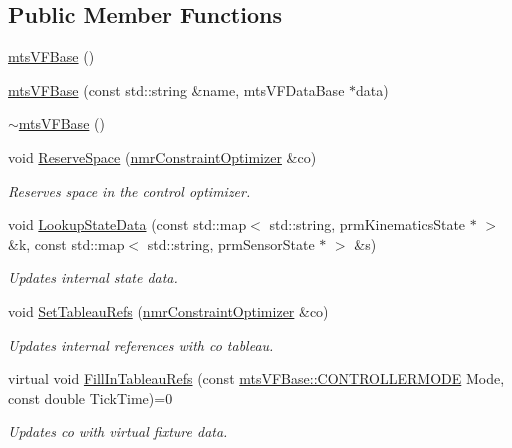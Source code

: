\subsection*{Public Member Functions}
\begin{DoxyCompactItemize}
\item 
\hyperlink{classmts_v_f_base_af45f36da21548b4a27ed600ea297f561}{mts\-V\-F\-Base} ()
\item 
\hyperlink{classmts_v_f_base_a987037c15360ca274ea15bf77566d287}{mts\-V\-F\-Base} (const std\-::string \&name, mts\-V\-F\-Data\-Base $\ast$data)
\item 
\hyperlink{classmts_v_f_base_a2759ee462431dd6812a0d692a9e77421}{$\sim$mts\-V\-F\-Base} ()
\item 
void \hyperlink{classmts_v_f_base_a3e76c6704734935a282808ffeeaf157b}{Reserve\-Space} (\hyperlink{classnmr_constraint_optimizer}{nmr\-Constraint\-Optimizer} \&co)
\begin{DoxyCompactList}\small\item\em Reserves space in the control optimizer. \end{DoxyCompactList}\item 
void \hyperlink{classmts_v_f_base_a4df54b20e4f1ee7207dcb1eb2b13d97a}{Lookup\-State\-Data} (const std\-::map$<$ std\-::string, prm\-Kinematics\-State $\ast$ $>$ \&k, const std\-::map$<$ std\-::string, prm\-Sensor\-State $\ast$ $>$ \&s)
\begin{DoxyCompactList}\small\item\em Updates internal state data. \end{DoxyCompactList}\item 
void \hyperlink{classmts_v_f_base_aaabcfe927229923f30b7722a7d97606e}{Set\-Tableau\-Refs} (\hyperlink{classnmr_constraint_optimizer}{nmr\-Constraint\-Optimizer} \&co)
\begin{DoxyCompactList}\small\item\em Updates internal references with co tableau. \end{DoxyCompactList}\item 
virtual void \hyperlink{classmts_v_f_base_aef5a28675f79945766a2b114c957ae6f}{Fill\-In\-Tableau\-Refs} (const \hyperlink{classmts_v_f_base_a742dd08f8b70bafeb746cec14d9ee974}{mts\-V\-F\-Base\-::\-C\-O\-N\-T\-R\-O\-L\-L\-E\-R\-M\-O\-D\-E} Mode, const double Tick\-Time)=0
\begin{DoxyCompactList}\small\item\em Updates co with virtual fixture data. \end{DoxyCompactList}\item 

\end{DoxyCompactItemize}
